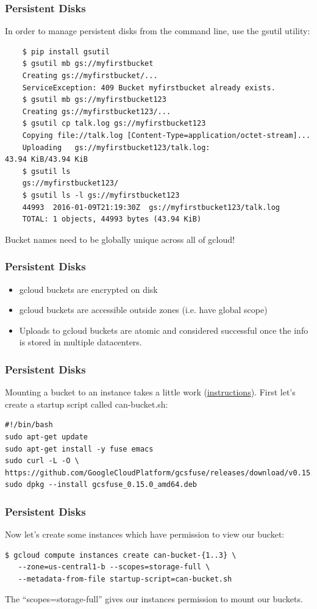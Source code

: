 \documentclass[9pt]{beamer}
\begin{document}
\begin{frame}[fragile]
  \frametitle{Persistent Disks}
  In order to manage persistent disks from the command line, use the gsutil utility:
  \begin{verbatim}
    $ pip install gsutil
    $ gsutil mb gs://myfirstbucket
    Creating gs://myfirstbucket/...
    ServiceException: 409 Bucket myfirstbucket already exists.
    $ gsutil mb gs://myfirstbucket123
    Creating gs://myfirstbucket123/...
    $ gsutil cp talk.log gs://myfirstbucket123
    Copying file://talk.log [Content-Type=application/octet-stream]...
    Uploading   gs://myfirstbucket123/talk.log:                      43.94 KiB/43.94 KiB
    $ gsutil ls
    gs://myfirstbucket123/
    $ gsutil ls -l gs://myfirstbucket123
    44993  2016-01-09T21:19:30Z  gs://myfirstbucket123/talk.log
    TOTAL: 1 objects, 44993 bytes (43.94 KiB)
  \end{verbatim}
  Bucket names need to be globally unique across all of gcloud!
\end{frame}

\begin{frame}[fragile]
  \frametitle{Persistent Disks}
  \begin{itemize}
  \item gcloud buckets are encrypted on disk
  \item gcloud buckets are accessible outside zones (i.e. have global scope)
  \item Uploads to gcloud buckets are atomic and considered successful once the info is stored in multiple datacenters.
  \end{itemize}
\end{frame}

\begin{frame}[fragile]
\frametitle{Persistent Disks}
Mounting a bucket to an instance takes a little work (\href{https://github.com/googlecloudplatform/gcsfuse/blob/master/docs/installing.md}{instructions}). First let's create a startup script called can-bucket.sh:
\begin{verbatim}
#!/bin/bash
sudo apt-get update
sudo apt-get install -y fuse emacs
sudo curl -L -O \
https://github.com/GoogleCloudPlatform/gcsfuse/releases/download/v0.15.0/gcsfuse_0.15.0_amd64.deb
sudo dpkg --install gcsfuse_0.15.0_amd64.deb
\end{verbatim}
\end{frame}
\begin{frame}[fragile]
\frametitle{Persistent Disks}
Now let's create some instances which have permission to view our bucket:
\begin{verbatim}
$ gcloud compute instances create can-bucket-{1..3} \
   --zone=us-central1-b --scopes=storage-full \
   --metadata-from-file startup-script=can-bucket.sh
\end{verbatim}
The ``scopes=storage-full'' gives our instances permission to mount our buckets.
\end{frame}
\end{document}
